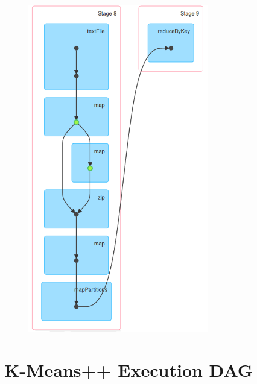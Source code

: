 \documentclass{l4proj}
\begin{document}
\begin{appendices}
\begin{figure}[H]
	\centering
    \includegraphics[width=0.70\textwidth]{images/DAG1}
    \label{fig:dag1}
\end{figure}

\section{K-Means++ Execution DAG}


\end{appendices}
\end{document}
